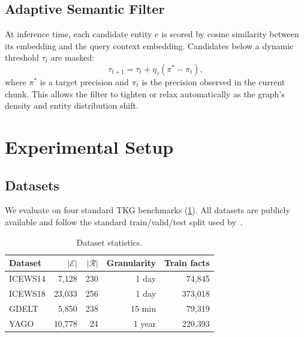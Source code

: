 \documentclass[10pt,twocolumn]{article}
\theoremstyle{definition}
\newcommand{\calE}{\mathcal{E}}
\newcommand{\calR}{\mathcal{R}}
\begin{document}
\subsection{Adaptive Semantic Filter}
\label{sec:filter}

At inference time, each candidate entity $e$ is scored by cosine similarity
between its embedding and the query context embedding.
Candidates below a dynamic threshold $\tau_t$ are masked:
\begin{equation}
  \tau_{t+1} = \tau_t + \eta_\tau (\pi^* - \pi_t),
\end{equation}
where $\pi^*$ is a target precision and $\pi_t$ is the precision observed
in the current chunk.
This allows the filter to tighten or relax automatically as the graph's
density and entity distribution shift.

\section{Experimental Setup}
\label{sec:setup}

\subsection{Datasets}
\label{sec:datasets}

We evaluate on four standard TKG benchmarks (\cref{tab:datasets}).
All datasets are publicly available and follow the standard
train/valid/test split used by~\citet{Akgul2025recipe}.

\begin{table}[h!]
\centering
\caption{Dataset statistics.}
\label{tab:datasets}
\small
\begin{tabular}{lrrrr}
\toprule
\textbf{Dataset} & \textbf{$|\calE|$} & \textbf{$|\calR|$}
                 & \textbf{Granularity} & \textbf{Train facts}\\
\midrule
ICEWS14 & 7,128  & 230 & 1 day    & 74,845  \\
ICEWS18 & 23,033 & 256 & 1 day    & 373,018 \\
GDELT   & 5,850  & 238 & 15 min   & 79,319  \\
YAGO    & 10,778 & 24  & 1 year   & 220,393 \\
\bottomrule
\end{tabular}
\end{table}
\end{document}
